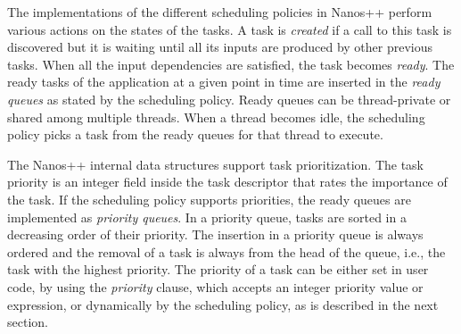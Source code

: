 {The implementations of the different scheduling policies in Nanos++ perform various actions on the states of the tasks. 
A task is \textit{created} if a call to this task is discovered but it is waiting until all its inputs are produced by other previous tasks. 
When all the input dependencies are satisfied, the task becomes \textit{ready}. 
The ready tasks of the application at a given point in time are inserted in the \textit{ready queues} as stated by the scheduling policy. 
Ready queues can be thread-private or shared among multiple threads. 
When a thread becomes idle, the scheduling policy picks a task from the ready queues for that thread to execute. 

The Nanos++ internal data structures support task prioritization. 
The task priority is an integer field inside the task descriptor that rates the importance of the task. 
If the scheduling policy supports priorities, the ready queues are implemented as \textit{priority queues}. 
In a priority queue, tasks are sorted in a decreasing order of their priority. 
The insertion in a priority queue is always ordered and the removal of a task is always from the head of the queue, i.e., the task with the highest priority. 
The priority of a task can be either set in user code, by using the \textit{priority} clause, which accepts an integer priority value or expression, or dynamically  by the scheduling policy, as is described in the next section.





}
